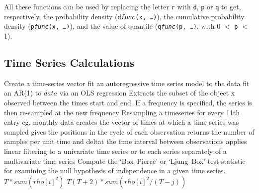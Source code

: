 All these functions can be used by replacing the letter {\tt r} with
{\tt d}, {\tt p} or {\tt q} to get, respectively, the probability
density ({\tt d{\it func}(x, \ldots)}), the cumulative probability
density ({\tt p{\it func}(x, \ldots)}), and the value of quantile
({\tt q{\it func}(p, \ldots)}, with 0 $<$ {\tt p} $<$ 1).

\subsection{Time Series Calculations}{}
	{Create a time-series vector}
	{fit an autoregressive time series model to the data}
	{fit an AR(1) to $data$ via
    an OLS regression}
	{Extracts the subset of the object x observed between the
    times start and end. If a frequency is specified, the series is then re-sampled
    at the new frequency}
	{Resampling a timeseries for
    every 11th entry eg. monthly data}
	{creates the vector of times at which a time series was sampled}
	{gives the positions in the cycle of each observation}
	{returns the number of samples per unit time and deltat the
    time interval between observations}
	{applies linear filtering to a univariate time series
    or to each series separately of a multivariate time series}
	{Compute the `Box--Pierce' or `Ljung--Box'
test statistic for examining the null hypothesis of independence in a given
time series.}
	{$T\ast sum(rho[i]^2)$}
	{$T(T+2)\ast sum(rho[i]^2/(T-j))$}

